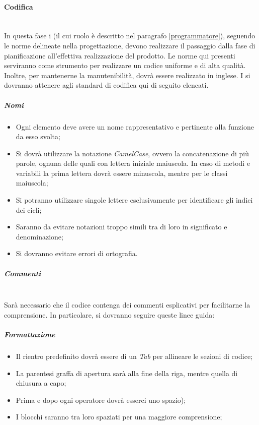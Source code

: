 	\paragraph{Codifica}
	~\\In questa fase i \progrs{} (il cui ruolo è descritto nel paragrafo \ref{programmatore}), seguendo le norme delineate nella progettazione, devono realizzare il passaggio dalla fase di pianificazione all'effettiva realizzazione del prodotto.
	Le norme qui presenti serviranno come strumento per realizzare un codice uniforme e di alta qualità. Inoltre, per mantenerne la manutenibilità, dovrà essere realizzato in inglese.
	I \progrs{} si dovranno attenere agli standard di codifica qui di seguito elencati.
	\subparagraph{Nomi}
	\begin{itemize}
		\item Ogni elemento deve avere un nome rappresentativo e pertinente alla funzione da esso svolta;
		\item Si dovrà utilizzare la notazione \emph{CamelCase}, ovvero la concatenazione di più parole, ognuna delle quali con lettera iniziale maiuscola. In caso di metodi e variabili la prima lettera dovrà essere minuscola, mentre per le classi maiuscola;
		\item Si potranno utilizzare singole lettere esclusivamente per identificare gli indici dei cicli;
		\item Saranno da evitare notazioni troppo simili tra di loro in significato e denominazione;
		\item Si dovranno evitare errori di ortografia.
	\end{itemize}
	\subparagraph{Commenti}
	~\\Sarà necessario che il codice contenga dei commenti esplicativi per facilitarne la comprensione.
	\newline In particolare, si dovranno seguire queste linee guida:
	
	\begin{comment}
	\begin{itemize}
		\item \textcolor{red}{lista di linee guida per i commenti}
	\end{itemize}
	\end{comment}
	
	\subparagraph{Formattazione}
	\begin{itemize} 
		\item Il rientro predefinito dovrà essere di un \emph{Tab} per allineare le sezioni di codice;
		\item La parentesi graffa di apertura sarà alla fine della riga, mentre quella di chiusura a capo;
		\item Prima e dopo ogni operatore dovrà esserci uno spazio);
		\item I blocchi saranno tra loro spaziati per una maggiore comprensione;
	\end{itemize}
